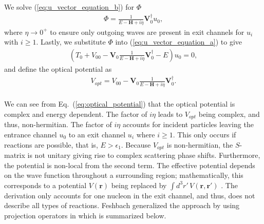 \documentclass[preprintnumbers,floatfix,aps,prc,preprint,nofootinbib]{revtex4-1}
\begin{document}
%
We solve (\ref{eq:u_vector_equation_b}) for $\Phi$
%
\begin{eqnarray}
	\label{eq:phi}
	\Phi = \frac{1}{E - \textbf{H} + i \eta} \textbf{V}_0^{\dagger} u_0,
\end{eqnarray}
%
where $\eta \rightarrow 0^+$ to ensure only outgoing waves are present in exit channels for $u_i$ with $i \geq 1$. Lastly, we substitute $\Phi$ into (\ref{eq:u_vector_equation_a}) to give
%
\begin{eqnarray}
	\label{eq:u0_equation}
	(T_0 + V_{00}  - \textbf{V}_0 \frac{1}{E-\textbf{H}+i\eta} \textbf{V}_0^{\dagger} - E) u_0 = 0,
\end{eqnarray}
%
and define the optical potential as
%
\begin{eqnarray}
	\label{eq:optical_potential}
	V_{opt} = V_{00}  - \textbf{V}_0 \frac{1}{E-\textbf{H}+i\eta} \textbf{V}_0^{\dagger}.
\end{eqnarray}
%
\\

We can see from Eq.~(\ref{eq:optical_potential}) that the optical potential is complex and energy dependent. The factor of $i \eta$ leads to $V_{opt}$ being complex, and thus, non-hermitian. The factor of $i \eta$ accounts for incident particles leaving the entrance channel $u_0$ to an exit channel $u_i$ where $i \geq 1$. This only occurs if reactions are possible, that is, $E > \epsilon_1$. Because $V_{opt}$ is non-hermitian, the $S$-matrix is not unitary giving rise to complex scattering phase shifts. Furthermore, the potential is non-local from the second term. The effective potential depends on the wave function throughout a surrounding region; mathematically, this corresponds to a potential $V(\textbf{r})$ being replaced by $\int d^3 r' \, V(\textbf{r}, \textbf{r}')$ \cite{Hodgson:1971ab}. The derivation only accounts for one nucleon in the exit channel, and thus, does not describe all types of reactions. Feshbach generalized the approach by using projection operators in \cite{Feshbach:1962ut} which is summarized below.
\\
\end{document}
